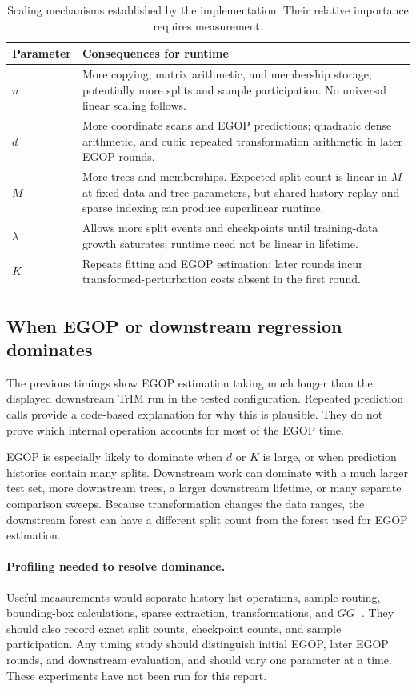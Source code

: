 \documentclass[11pt]{article}
\begin{document}
\begin{table}[htbp]
\centering\small
\begin{tabularx}{\textwidth}{lY}
\toprule
Parameter & Consequences for runtime \\
\midrule
$n$ & More copying, matrix arithmetic, and membership storage; potentially more splits and sample participation. No universal linear scaling follows. \\
$d$ & More coordinate scans and EGOP predictions; quadratic dense arithmetic, and cubic repeated transformation arithmetic in later EGOP rounds. \\
$M$ & More trees and memberships. Expected split count is linear in $M$ at fixed data and tree parameters, but shared-history replay and sparse indexing can produce superlinear runtime. \\
$\lambda$ & Allows more split events and checkpoints until training-data growth saturates; runtime need not be linear in lifetime. \\
$K$ & Repeats fitting and EGOP estimation; later rounds incur transformed-perturbation costs absent in the first round. \\
\bottomrule
\end{tabularx}
\caption{Scaling mechanisms established by the implementation. Their relative importance requires measurement.}
\end{table}

\subsection{When EGOP or downstream regression dominates}

The previous timings show EGOP estimation taking much longer than the displayed downstream TrIM run in the tested configuration. Repeated prediction calls provide a code-based explanation for why this is plausible. They do not prove which internal operation accounts for most of the EGOP time.

EGOP is especially likely to dominate when $d$ or $K$ is large, or when prediction histories contain many splits. Downstream work can dominate with a much larger test set, more downstream trees, a larger downstream lifetime, or many separate comparison sweeps. Because transformation changes the data ranges, the downstream forest can have a different split count from the forest used for EGOP estimation.

\paragraph{Profiling needed to resolve dominance.}
Useful measurements would separate history-list operations, sample routing, bounding-box calculations, sparse extraction, transformations, and $GG^\top$. They should also record exact split counts, checkpoint counts, and sample participation. Any timing study should distinguish initial EGOP, later EGOP rounds, and downstream evaluation, and should vary one parameter at a time. These experiments have not been run for this report.
\end{document}
